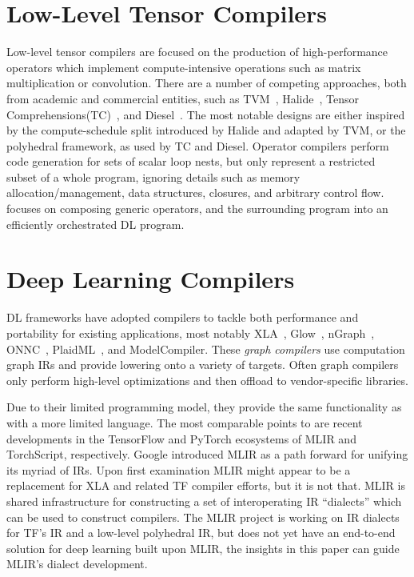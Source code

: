 \section{Low-Level Tensor Compilers}
Low-level tensor compilers are focused on the production
    of high-performance operators which implement compute-intensive
    operations such as matrix multiplication or convolution.
There are a number of competing approaches,
    both from academic and commercial entities, such as
    TVM~\citep{tvm_osdi18}, Halide~\citep{halide}, Tensor Comprehensions(TC)~\citep{tensor_comprehensions},
    and Diesel~\citep{diesel}.
The most notable designs are either inspired by the
    compute-schedule split introduced by Halide
    and adapted by TVM, or the polyhedral framework,
    as used by TC and Diesel.
Operator compilers perform code generation for sets of scalar loop nests,
    but only represent a restricted subset of a whole program, ignoring details such as
    memory allocation/management, data structures, closures, and arbitrary control flow.
\relay focuses on composing generic operators, and the surrounding program
    into an efficiently orchestrated DL program.

\section{Deep Learning Compilers}

DL frameworks have adopted compilers
    to tackle both performance and portability
    for existing applications, most notably
    XLA~\citep{xla}, Glow~\citep{glow}, nGraph~\citep{ngraph}, ONNC~\citep{onnc},
    PlaidML~\citep{plaidml}, and ModelCompiler.
These \textit{graph compilers} use computation graph IRs and provide
    lowering onto a variety of targets.
Often graph compilers only perform high-level optimizations
    and then offload to vendor-specific libraries.

Due to their limited programming model, they
    provide the same functionality as \relay with
    a more limited language.
The most comparable points to \relay are recent
    developments in the TensorFlow and PyTorch
    ecosystems of MLIR and TorchScript, respectively.
Google introduced MLIR as a path forward for
    unifying its myriad of IRs.
Upon first examination MLIR might appear to be
    a replacement for XLA and related TF compiler
    efforts, but it is not that.
MLIR is shared infrastructure for constructing
    a set of interoperating IR ``dialects'' which
    can be used to construct compilers.
The MLIR project is working on IR dialects
    for TF's IR and a low-level polyhedral IR,
    but does not yet have an end-to-end solution for
    deep learning built upon MLIR, the insights in
    this paper can guide MLIR's dialect development.

